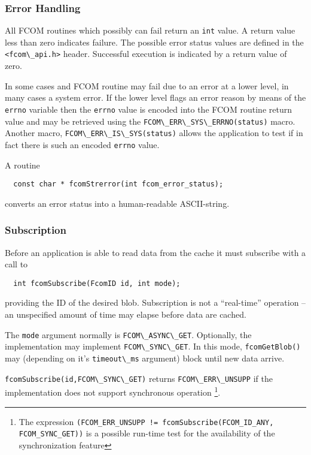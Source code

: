 \documentclass[11pt]{article}
\newcommand{\fcom}{FCOM}
\newcommand{\blob}{blob}
\newcommand{\cstl}[1]{{\lstinline+#1+}}
\begin{document}
    \subsubsection{Error Handling}
      All \fcom{} routines which possibly can fail return an \cstl{int}
      value. A return value less than zero indicates failure. The
      possible error status values are defined in the \cstl{<fcom\_api.h>}
      header. Successful execution is indicated by a return value of 
      zero.

      In some cases and \fcom{} routine may fail due to an error
      at a lower level, in many cases a system error. If the lower
      level flags an error reason by means of the \cstl{errno} 
      variable then the \cstl{errno} value is encoded into
      the \fcom{} routine return value and may be retrieved using
      the \cstl{FCOM\_ERR\_SYS\_ERRNO(status)} macro.
      Another macro, \cstl{FCOM\_ERR\_IS\_SYS(status)} allows
      the application to test if in fact there is such an encoded
      \cstl{errno} value.

      A routine
      \begin{verbatim}
  const char * fcomStrerror(int fcom_error_status);
      \end{verbatim}
      converts an error status into a human-readable ASCII-string.
    \subsubsection{Subscription}
      Before an application is able to read data from the cache
      it must subscribe with a call to
      \begin{verbatim}
  int fcomSubscribe(FcomID id, int mode);
      \end{verbatim}
      providing the ID of the desired \blob{}. Subscription is
      not a ``real-time'' operation -- an unspecified amount of
      time may elapse before data are cached.

      The \cstl{mode} argument normally is \cstl{FCOM\_ASYNC\_GET}.
      Optionally, the implementation may implement \cstl{FCOM\_SYNC\_GET}.
      In this mode, \cstl{fcomGetBlob()} may (depending on
      it's \cstl{timeout\_ms} argument) block until new
      data arrive.

      \cstl{fcomSubscribe(id,FCOM\_SYNC\_GET)} returns
      \cstl{FCOM\_ERR\_UNSUPP} if the implementation does not support
      synchronous operation%
\footnote{
The expression
{\tt (FCOM\_ERR\_UNSUPP != fcomSubscribe(FCOM\_ID\_ANY, FCOM\_SYNC\_GET))}
is a possible run-time test for the availability of the
synchronization feature%
}.
\end{document}
